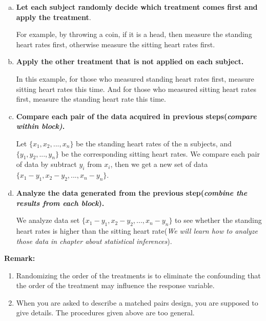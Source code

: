 \documentclass[a4paper, 12pt,twoside]{book}
\begin{document}
\begin{enumerate}[(1)]
    \begin{enumerate}[(a)]
        \item \textbf{Let each subject randomly decide which treatment comes first and apply the treatment}. 
        
        For example, by throwing a coin, if it is a head, then measure the standing heart rates first, otherwise measure the sitting heart rates first.
        \item \textbf{Apply the other treatment that is not applied on each subject.} 
        
        In this example, for those who measured standing heart rates first, measure sitting heart rates this time. And for those who measured sitting heart rates first, measure the standing heart rate this time.
        \item \textbf{Compare each pair of the data acquired in previous steps(\textit{compare within block)}.} 
        
        Let $\{x_1, x_2, ..., x_n\}$ be the standing heart rates of the n subjects, and $\{y_1, y_2, ..., y_n\}$ be the corresponding sitting heart rates. We compare each pair of data by subtract $y_i$ from $x_i$, then we get a new set of data $\{x_1-y_1, x_2-y_2, ..., x_n-y_n\}$.
        \item\textbf{ Analyze the data generated from the previous step(\textit{combine the results from each block}). }
        
        We analyze data set $\{x_1-y_1, x_2-y_2, ..., x_n-y_n\}$ to see whether the standing heart rates is higher than the sitting heart rate(\textit{We will learn how to analyze those data in chapter about statistical inferences}).
    \end{enumerate}
    \vspace{0.3cm}
    
    \colorbox{babypink}{\parbox{0.95\textwidth}{
    \textbf{Remark:}
    
        \begin{enumerate}[\Roman*.]
            \item Randomizing the order of the treatments is to eliminate the confounding that the order of the treatment may influence the response variable.
            \item When you are asked to describe a matched pairs design, you are supposed to give details. The procedures given above are too general.
        \end{enumerate}
    }}
  \vspace{0.6cm}
    \newpage
    

\end{enumerate}
\end{document}
